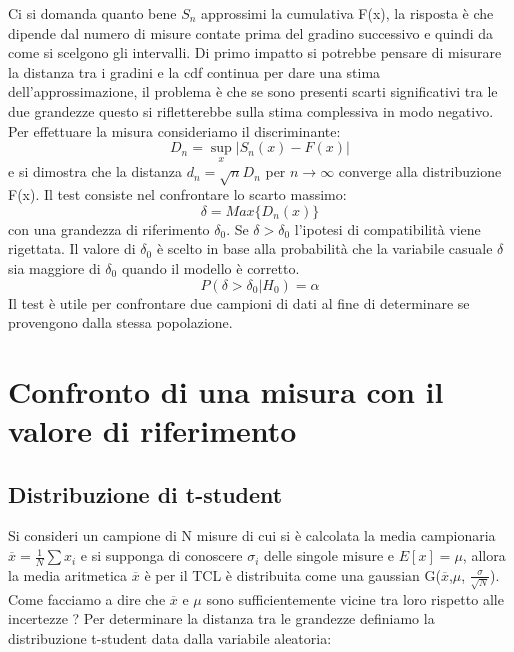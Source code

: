 Ci si domanda quanto bene $S_n$ approssimi la cumulativa F(x), la risposta \`{e} che dipende dal numero di misure contate prima del gradino successivo e quindi da come si scelgono gli intervalli. Di primo impatto si potrebbe pensare di misurare la distanza tra i gradini e la cdf continua per dare una stima dell'approssimazione, il problema \`{e} che se sono presenti scarti significativi tra le due grandezze questo si rifletterebbe sulla stima complessiva in modo negativo. Per effettuare la misura consideriamo il discriminante:
\begin{equation*}
	D_n = \sup_{x} \vert S_n(x) -F(x) \vert 
\end{equation*}
 e si dimostra che la distanza $d_n = \sqrt{n}D_n$ per $n \rightarrow \infty$ converge alla distribuzione F(x).
 Il test consiste nel confrontare lo scarto massimo:
 \begin{equation*}
 	\delta = Max \{D_n(x)\}
 \end{equation*}
 con una grandezza di riferimento $\delta_0$. Se $\delta > \delta_0$ l'ipotesi di compatibilit\`{a} viene rigettata. Il valore di $\delta_0$ \`{e} scelto in base alla probabilit\`{a} che la variabile casuale $\delta$ sia maggiore di $\delta_0$ quando il modello \`{e} corretto.
 \begin{equation*}
 	P(\delta > \delta_0 \vert H_0) = \alpha
 \end{equation*}
 Il test \`{e} utile per confrontare due campioni di dati al fine di determinare se provengono dalla stessa popolazione.
 
 \section{Confronto di una misura con il valore di riferimento}
 \subsection{Distribuzione di t-student}
 Si consideri un campione di N misure di cui si \`{e} calcolata la media campionaria $\overline{x} = \frac{1}{N} \sum x_i$ e si supponga di conoscere $\sigma_i$ delle singole misure e $E[x] = \mu$, allora la media aritmetica $\overline{x}$ \`{e} per il TCL \`{e} distribuita come una gaussian G($\overline{x}$,$\mu$, $\frac{\sigma}{\sqrt{N}}$). Come facciamo a dire che $\overline{x}$ e ${\mu}$ sono sufficientemente vicine tra loro rispetto alle incertezze ?
 \newline
 Per determinare la distanza tra le grandezze definiamo la distribuzione t-student data dalla variabile aleatoria:
 
